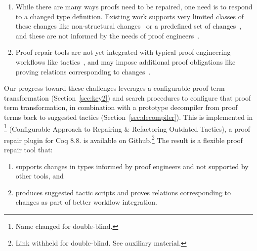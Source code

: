 \begin{enumerate}
\item While there are many ways proofs need to be repaired, one need is to respond to a changed type definition.
Existing work supports very limited classes of these changes like non-structural changes~\cite{pumpkinpatch} or a predefined set
of changes~\cite{robert2018, wibergh2019}, and these are not informed by the needs of proof engineers~\cite{replica}.
\item Proof repair tools are not yet integrated with typical proof engineering workflows like tactics~\cite{PGL-045, pumpkinpatch, robert2018},
and may impose additional proof obligations like proving relations corresponding to changes~\cite{Ringer2019}.
\end{enumerate}
%

Our progress toward these challenges leverages a configurable proof term transformation (Section~\ref{sec:key2})
and search procedures to configure that proof term transformation, in combination with a prototype decompiler from proof terms
back to suggested tactics (Section~\ref{sec:decompiler}).
This is implemented in \toolname\footnote{Name changed for double-blind.} (Configurable Approach to Repairing \& Refactoring Outdated Tactics), a proof repair plugin for Coq 8.8.
\toolname is available on Github.\footnote{Link withheld for double-blind. See auxiliary material.}
The result is a flexible proof repair tool that: 

\begin{enumerate}
\item supports changes in types informed by proof engineers and not supported by other tools, and
\item produces suggested tactic scripts and proves relations corresponding to changes as part of better workflow integration.
\end{enumerate}


